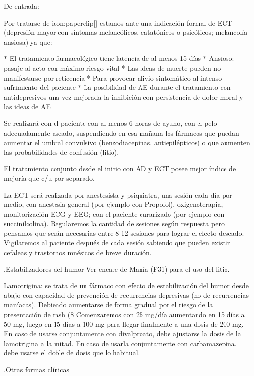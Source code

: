 \documentclass{scrbook}
\begin{document}
De entrada:

Por tratarse de icon:paperclip[] estamos ante una indicación formal de ECT (depresión mayor con síntomas melancólicos, catatónicos o psicóticos; melancolía ansiosa) ya que:

* El tratamiento farmacológico tiene latencia de al menos 15 días
* Ansioso: pasaje al acto con máximo riesgo vital
* Las ideas de muerte pueden no manifestarse por reticencia
* Para provocar alivio sintomático al intenso sufrimiento del paciente
* La posibilidad de AE durante el tratamiento con antidepresivos una vez mejorada la inhibición con persistencia de dolor moral y las ideas de AE

Se realizará con el paciente con al menos 6 horas de ayuno, con el pelo adecuadamente aseado, suspendiendo en esa mañana los fármacos que puedan aumentar el umbral convulsivo (benzodiacepinas, antiepilépticos) o que aumenten las probabilidades de confusión (litio).

El tratamiento conjunto desde el inicio con AD y ECT posee mejor índice de mejoría que c/u por separado.

La ECT será realizada por anestesista y psiquiatra, una sesión cada día por medio, con anestesia general (por ejemplo con Propofol), oxigenoterapia, monitorización ECG y EEG; con el paciente curarizado (por ejemplo con succinilcolina). Regularemos la cantidad de sesiones según respuesta pero pensamos que serán necesarias entre 8-12 sesiones para lograr el efecto deseado. Vigilaremos al paciente después de cada sesión sabiendo que pueden existir cefaleas y trastornos mnésicos de breve duración.

.Estabilizadores del humor
Ver encare de Manía (F31) para el uso del litio.

Lamotrigina: se trata de un fármaco con efecto de estabilización del humor desde abajo con capacidad de prevención de recurrencias depresivas (no de recurrencias maníacas). Debiendo aumentarse de forma gradual por el riesgo de la presentación de rash (8%
Comenzaremos con 25 mg/día aumentando en 15 días a 50 mg, luego en 15 días a 100 mg para llegar finalmente a una dosis de 200 mg. En caso de usarse conjuntamente con divalproato, debe ajustarse la dosis de la lamotrigina a la mitad. En caso de usarla conjuntamente con carbamazepina, debe usarse el doble de dosis que lo habitual.

.Otras formas clínicas
\end{document}
